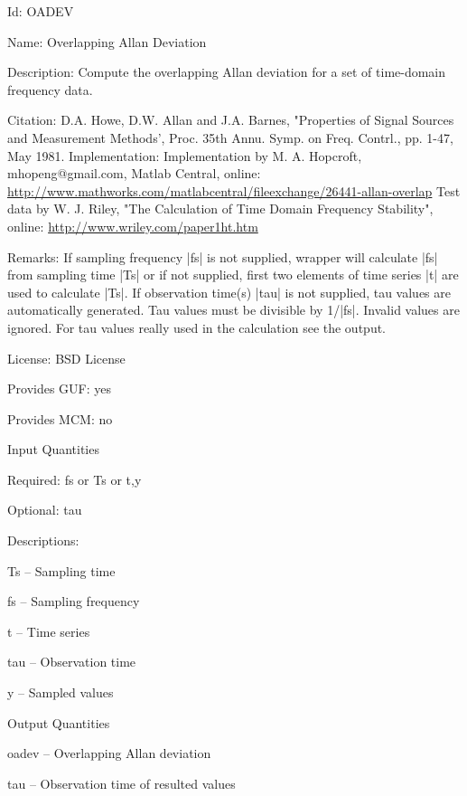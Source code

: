 \begin{tightdesc}
\item [Id:] OADEV
\item [Name:] Overlapping Allan Deviation
\item [Description:] Compute the overlapping Allan deviation for a set of time-domain frequency data.
\item [Citation:] D.A. Howe, D.W. Allan and J.A. Barnes, "Properties of Signal Sources and Measurement Methods', Proc. 35th Annu. Symp. on Freq. Contrl., pp. 1-47, May 1981. Implementation: Implementation by M. A. Hopcroft, mhopeng@gmail.com, Matlab Central, online: \url{http://www.mathworks.com/matlabcentral/fileexchange/26441-allan-overlap} Test data by W. J. Riley, "The Calculation of Time Domain Frequency Stability", online: \url{http://www.wriley.com/paper1ht.htm}
\item [Remarks:] If sampling frequency |fs| is not supplied, wrapper will calculate |fs| from sampling time |Ts| or if not supplied, first two elements of time series |t| are used to calculate |Ts|. If observation time(s) |tau| is not supplied, tau values are automatically generated. Tau values must be divisible by 1/|fs|. Invalid values are ignored. For tau values really used in the calculation see the output.
\item [License:] BSD License
\item [Provides GUF:] yes
\item [Provides MCM:] no
\item [Input Quantities] \rule{0em}{0em}
    \begin{tightdesc}
    \item [Required:] 
        \textsf{fs} or \textsf{Ts} or \textsf{t},\enspace \textsf{y}
    \item [Optional:] 
        \textsf{tau}
    \end{tightdesc}
\item [Descriptions:] \rule{0em}{0em}
    \begin{tightdesc}
        \item[\textsf{Ts}] -- Sampling time
        \item[\textsf{fs}] -- Sampling frequency
        \item[\textsf{t}] -- Time series
        \item[\textsf{tau}] -- Observation time
        \item[\textsf{y}] -- Sampled values
    \end{tightdesc}
\item [Output Quantities] \rule{0em}{0em}
    \begin{tightdesc}
        \item[\textsf{oadev}] -- Overlapping Allan deviation
        \item[\textsf{tau}] -- Observation time of resulted values
    \end{tightdesc}
\end{tightdesc}
